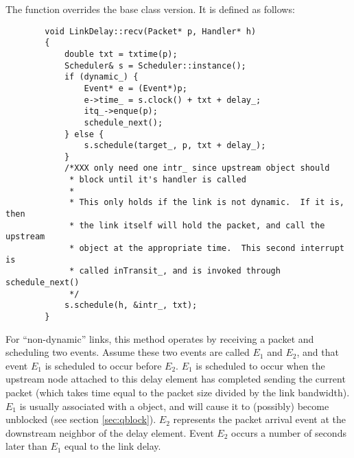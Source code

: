 The  function overrides the  base class version.
It is defined as follows:
\begin{small}
\begin{verbatim}
        void LinkDelay::recv(Packet* p, Handler* h)
        {    
        	double txt = txtime(p);
        	Scheduler& s = Scheduler::instance();
        	if (dynamic_) {
        		Event* e = (Event*)p;
        		e->time_ = s.clock() + txt + delay_; 
        		itq_->enque(p);
        		schedule_next();
        	} else {
        		s.schedule(target_, p, txt + delay_);
        	}       
        	/*XXX only need one intr_ since upstream object should
        	 * block until it's handler is called
        	 *       
        	 * This only holds if the link is not dynamic.  If it is, then
        	 * the link itself will hold the packet, and call the upstream
        	 * object at the appropriate time.  This second interrupt is
        	 * called inTransit_, and is invoked through schedule_next()
        	 */      
        	s.schedule(h, &intr_, txt);
        }   

\end{verbatim}
\end{small}
For ``non-dynamic'' links,
this method operates by receiving a packet and scheduling two
events.
Assume these two events are called $E_1$ and $E_2$, and that
event $E_1$ is scheduled to occur before $E_2$.
$E_1$ is scheduled to occur when the upstream node attached to this
delay element has completed sending the current packet
(which takes time equal to the packet size divided by the link bandwidth).
$E_1$ is usually associated with a  object, and will
cause it to (possibly) become unblocked (see section \ref{sec:qblock}).
$E_2$ represents the packet arrival event at the downstream neighbor
of the delay element.
Event $E_2$ occurs a number of seconds later than $E_1$ equal to the
link delay.

\subsection{}

